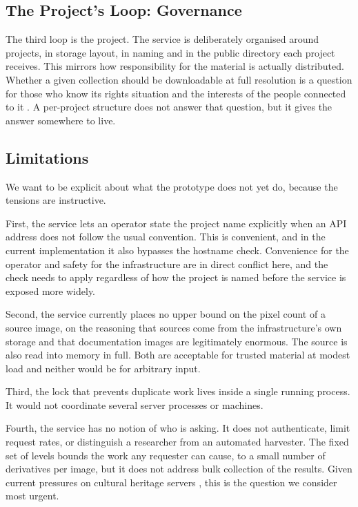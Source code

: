 \documentclass{dhnbpub}
\begin{document}
\subsection{The Project's Loop: Governance}

The third loop is the project. The service is deliberately organised
around projects, in storage layout, in naming and in the public
directory each project receives. This mirrors how responsibility for
the material is actually distributed. Whether a given collection should
be downloadable at full resolution is a question for those who know
its rights situation and the interests of the people connected to it
\citep{carroll2020}. A per-project structure does not answer that
question, but it gives the answer somewhere to live.

\subsection{Limitations}

We want to be explicit about what the prototype does not yet do,
because the tensions are instructive.

First, the service lets an operator state the project name explicitly
when an API address does not follow the usual convention. This is
convenient, and in the current implementation it also bypasses the
hostname check. Convenience for the operator and safety for the
infrastructure are in direct conflict here, and the check needs to
apply regardless of how the project is named before the service is
exposed more widely.

Second, the service currently places no upper bound on the pixel count
of a source image, on the reasoning that sources come from the
infrastructure's own storage and that documentation images are
legitimately enormous. The source is also read into memory in full.
Both are acceptable for trusted material at modest load and neither
would be for arbitrary input.

Third, the lock that prevents duplicate work lives inside a single
running process. It would not coordinate several server processes or
machines.

Fourth, the service has no notion of who is asking. It does not
authenticate, limit request rates, or distinguish a researcher from an
automated harvester. The fixed set of levels bounds the work any
requester can cause, to a small number of derivatives per image, but it
does not address bulk collection of the results. Given current
pressures on cultural heritage servers \citep{weinberg2025}, this is
the question we consider most urgent.
\end{document}
